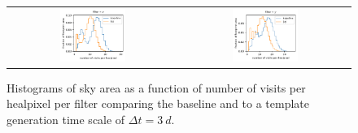 \documentclass[preprintm,linenumbers]{aastex631}
\begin{document}
\begin{figure}
\begin{tabular}{c c}
				 \includegraphics[width=0.4\textwidth]{results/histograms/hist_first_year_one_snap_v4_0_10yrs_db_noDD_noTwi_CountMetric_doAllTemplateMetrics_reduceCount_z_3_noDD_noTwi.pdf} &
				\includegraphics[width=0.4\textwidth]{results/histograms/hist_first_year_one_snap_v4_0_10yrs_db_noDD_noTwi_CountMetric_doAllTemplateMetrics_reduceCount_y_3_noDD_noTwi.pdf} \\
    			
			\end{tabular}
			\caption{
				Histograms of sky area as a function of number of visits per healpixel per filter comparing the baseline and to a template generation time scale of $\Delta t = 3\ \si{d}$. \label{appendixb:1}}
		\end{figure}
\end{document}
